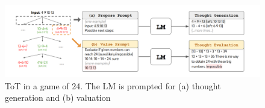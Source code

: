 \documentclass[12pt, a4paper]{article}
\begin{document}
\bigskip
\bigskip

\begin{figure}[H]
    \centering
    \includegraphics[width=\textwidth,height=0.45\textwidth]{game24sol.png}
    \caption{ ToT in a game of 24. The LM is prompted for (a) thought generation and (b) valuation}
    \label{fig:g24.}
\end{figure}
\end{document}
